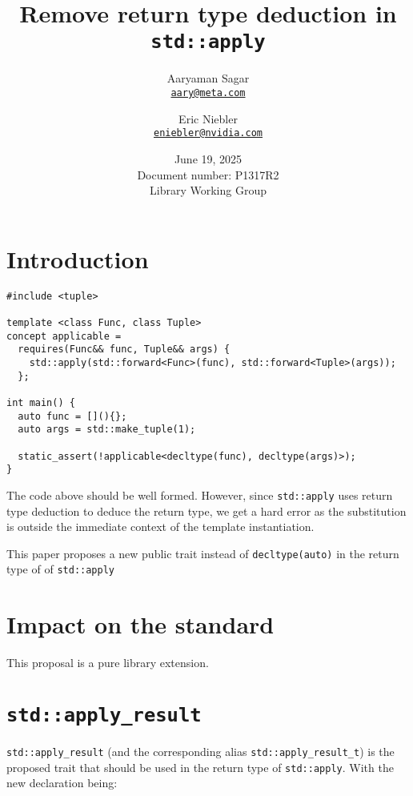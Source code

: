 \documentclass{article}
\begin{document}
\title{\textbf{Remove return type deduction in \texttt{std::apply}}}
\author{
  Aaryaman Sagar\\
  \href{mailto:aary@meta.com}{\texttt{aary@meta.com}}
  \and
  Eric Niebler\\
  \href{mailto:eniebler@nvidia.com}{\texttt{eniebler@nvidia.com}}
}
\date{June 19, 2025 \\ Document number: P1317R2 \\ Library Working Group}
\maketitle

\section{Introduction}

\begin{lstlisting}
#include <tuple>

template <class Func, class Tuple>
concept applicable =
  requires(Func&& func, Tuple&& args) {
    std::apply(std::forward<Func>(func), std::forward<Tuple>(args));
  };

int main() {
  auto func = [](){};
  auto args = std::make_tuple(1);

  static_assert(!applicable<decltype(func), decltype(args)>);
}
\end{lstlisting}

The code above should be well formed.  However, since \texttt{std::apply} uses
return type deduction to deduce the return type, we get a hard error as the
substitution is outside the immediate context of the template instantiation.

This paper proposes a new public trait instead of \texttt{decltype(auto)} in
the return type of of \texttt{std::apply}

\section{Impact on the standard}
This proposal is a pure library extension.

\section{\texttt{std::apply\_result}}
\texttt{std::apply\_result} (and the corresponding alias
\texttt{std::apply\_result\_t}) is the proposed trait that should be used in
the return type of \texttt{std::apply}.  With the new declaration being:
\end{document}
